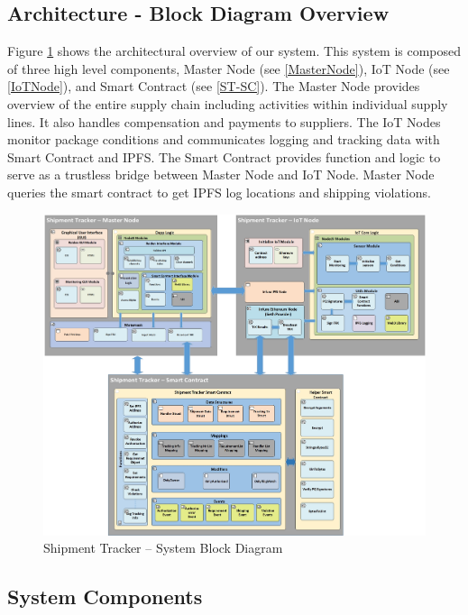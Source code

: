 \subsection{Architecture - Block Diagram Overview}
Figure \ref{fig:ArchitectureBD} shows the architectural overview of our system. This system is composed of three high level components, Master Node (see \ref{MasterNode}), IoT Node (see \ref{IoTNode}), and Smart Contract (see \ref{ST-SC}).  The Master Node provides overview of the entire supply chain including activities within individual supply lines. It also handles compensation and payments to suppliers. The IoT Nodes monitor package conditions and communicates logging and tracking data with Smart Contract and IPFS. The Smart Contract provides function and logic to serve as a trustless bridge between Master Node and IoT Node. Master Node queries the smart contract to get IPFS log locations and shipping violations.
\begin{figure}[h]
	\centering
    \includegraphics[width=180mm,scale=1]{figs/Blockdiagram}
	\caption{Shipment Tracker – System Block Diagram}
	\label{fig:ArchitectureBD} 
\end{figure}
\clearpage
\subsection{System Components} \label{SysComp} 
